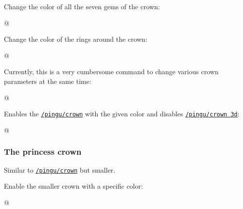 \documentclass[parskip=half,english,numbers=noenddot,footnotes=nomultiple,oneside]{scrartcl}
\def\lpingu#1{\lstinline[style=lstpingu,language=pingulang]'#1'}
\newcommand*\keyref[2][/pingu/]{\hyperref[pk:#1#2]{\lpingu{#1#2}}}
\begin{document}
Change the color of all the seven gems of the crown:
\begin{tcblisting}{@}
\begin{tikzpicture}
	\pingu[crown, crown gem colors={green}{green}
		{green}{white}{green}{green}{green}]
\end{tikzpicture}
\end{tcblisting}
\endsubkeyexplain

{\def\pingu@color@crown{<crown-color>}
Change the color of the rings around the crown:
\begin{tcblisting}{@}
\begin{tikzpicture}
	\pingu[crown, crown gem ring=green]
\end{tikzpicture}
\end{tcblisting}
\endsubkeyexplain}

Currently, this is a very cumbersome command to change various crown parameters at the same time:
\begin{tcblisting}{@}
\begin{tikzpicture}
	\pingu[crown, eyes wink,
		crown position={1:(-.1cm,-.275cm){1.33}}]
\end{tikzpicture}
\end{tcblisting}
\endsubkeyexplain

Enables the \keyref{crown} with the given color and disables \keyref{crown 3d}:
\begin{tcblisting}{@}
\begin{tikzpicture}
	\pingu[crown 2d=green]
\end{tikzpicture}
\end{tcblisting}
\endkeyexplain

\subsubsection{The princess crown}
Similar to \keyref{crown} but smaller.

Enable the smaller crown with a specific color:
\begin{tcblisting}{@}
\begin{tikzpicture}
	\pingu[princess crown=green]
\end{tikzpicture}
\end{tcblisting}
\endshowkeyexplain
\end{document}
